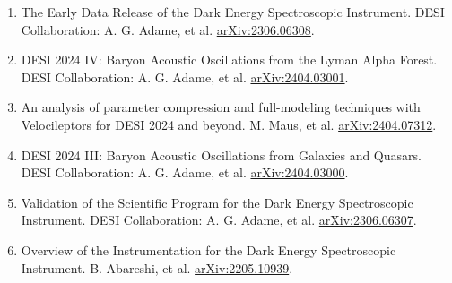 \begin{enumerate}[start=17]
\item The Early Data Release of the Dark Energy Spectroscopic Instrument. 
DESI Collaboration: A. G. Adame, et al. 
\href{https://arxiv.org/abs/2306.06308}{arXiv:2306.06308}.

\item DESI 2024 IV: Baryon Acoustic Oscillations from the Lyman Alpha Forest. 
DESI Collaboration: A. G. Adame, et al. 
\href{https://arxiv.org/abs/2404.03001}{arXiv:2404.03001}.

\item An analysis of parameter compression and full-modeling techniques with Velocileptors for DESI 2024 and beyond. 
M. Maus, et al. 
\href{https://arxiv.org/abs/2404.07312}{arXiv:2404.07312}.

\item DESI 2024 III: Baryon Acoustic Oscillations from Galaxies and Quasars. 
DESI Collaboration: A. G. Adame, et al. 
\href{https://arxiv.org/abs/2404.03000}{arXiv:2404.03000}.

\item Validation of the Scientific Program for the Dark Energy Spectroscopic Instrument. 
DESI Collaboration: A. G. Adame, et al. 
\href{https://arxiv.org/abs/2306.06307}{arXiv:2306.06307}.

\item Overview of the Instrumentation for the Dark Energy Spectroscopic Instrument. 
B. Abareshi, et al. 
\href{https://arxiv.org/abs/2205.10939}{arXiv:2205.10939}.
\end{enumerate}
